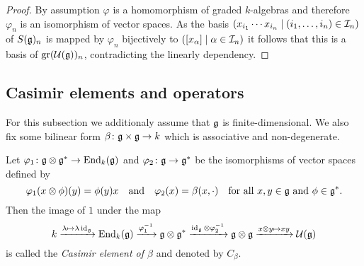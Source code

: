 \begin{proof}
 By assumption $\varphi$ is a homomorphism of graded $k$-algebras and therefore $\varphi_n$ is an isomorphism of vector spaces. As the basis $(x_{i_1} \dotsm x_{i_n} \mid (i_1, \dotsc, i_n) \in \mathcal{I}_n)$ of $S(\mathfrak{g})_n$ is mapped by $\varphi_n$ bijectively to $([x_\alpha] \mid \alpha \in \mathcal{I}_n)$ it follows that this is a basis of $\operatorname{gr}(\mathcal{U}(\mathfrak{g}))_n$, contradicting the linearly dependency.
\end{proof}
































\subsection{Casimir elements and operators}
For this subsection we additionaly assume that $\mathfrak{g}$ is finite-dimensional. We also fix some bilinear form $\beta \colon \mathfrak{g} \times \mathfrak{g} \to k$ which is associative and non-degenerate.


\begin{defi}\label{defi: definition of Casimir element}
 Let $\varphi_1 \colon \mathfrak{g} \otimes \mathfrak{g}^* \to \operatorname{End}_k(\mathfrak{g})$ and $\varphi_2 \colon \mathfrak{g} \to \mathfrak{g}^*$ be the isomorphisms of vector spaces defined by
 \[
  \varphi_1(x \otimes \phi)(y) = \phi(y) x
  \quad\text{and}\quad
  \varphi_2(x) = \beta(x, \cdot)
  \quad\text{for all $x,y \in \mathfrak{g}$ and $\phi \in \mathfrak{g}^*$}.
 \]
 Then the image of $1$ under the map
 \begin{equation}\label{eqn: Casimir without coordinates}
  k
  \xrightarrow{\lambda \mapsto \lambda \operatorname{id}_{\mathfrak{g}}}
  \operatorname{End}_k(\mathfrak{g})
  \xrightarrow{\varphi_1^{-1}}
  \mathfrak{g} \otimes \mathfrak{g}^*
  \xrightarrow{\operatorname{id}_{\mathfrak{g}} \otimes \varphi_2^{-1}}
  \mathfrak{g} \otimes \mathfrak{g}
  \xrightarrow{x \otimes y \mapsto x y}
  \mathcal{U}(\mathfrak{g})
 \end{equation}
 is called the \emph{Casimir element of $\beta$} and denoted by $C_\beta$.
\end{defi}


